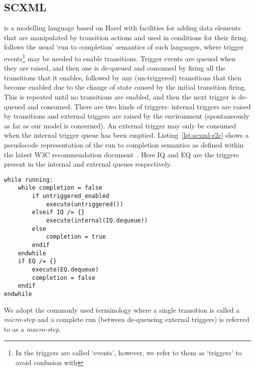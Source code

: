 

\subsection{SCXML}
\label{sec:scxml}

\SCXML is a modelling language based on Harel \statecharts with facilities for adding data elements that are manipulated by transition actions and used in conditions for their firing. \SCXML follows the usual `run to completion' semantics of such \statechart languages, where trigger events\footnote{In \SCXML the triggers are called `events', however, we refer to them as `triggers' to avoid confusion with \EventB} may be needed to enable transitions. Trigger events are queued when they are raised, and then one is de-queued and consumed by firing all the transitions that it enables, followed by any (un-triggered) transitions that then become enabled due to the change of state caused by the initial transition firing. This is repeated until no transitions are enabled, and then the next trigger is de-queued and consumed. There are two kinds of triggers: internal triggers are raised by transitions and external triggers are raised by the environment (spontaneously as far as our model is concerned). An external trigger may only be consumed when the internal trigger queue has been emptied. Listing~\ref{lst:scxml-r2c} shows a pseudocode representation of the run to completion semantics as defined within the latest W3C recommendation document~\cite{scxmlwebsite}. Here IQ and EQ are the triggers present in the internal and external queues respectively. 

\begin{lstlisting}[caption=Pseudocode for 'run to completion',label={lst:scxml-r2c}, frame=single]
while running:
	while completion = false
		if untriggered_enabled
			execute(untriggered())
		elseif IQ /= {}
			execute(internal(IQ.dequeue)) 
		else
			completion = true
		endif
	endwhile
	if EQ /= {}
		execute(EQ.dequeue) 
		completion = false
	endif
endwhile 
\end{lstlisting}

We adopt the commonly used terminology where a single transition is called a \emph{micro-step} and a complete run (between de-queueing external triggers) is referred to as a \emph{macro-step}.

